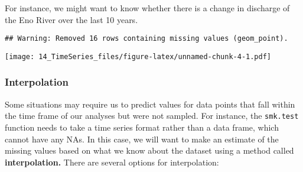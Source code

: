 \documentclass[]{article}
\newenvironment{Shaded}{\begin{snugshade}}{\end{snugshade}}
\newcommand{\KeywordTok}[1]{\textcolor[rgb]{0.13,0.29,0.53}{\textbf{#1}}}
\newcommand{\DataTypeTok}[1]{\textcolor[rgb]{0.13,0.29,0.53}{#1}}
\newcommand{\FloatTok}[1]{\textcolor[rgb]{0.00,0.00,0.81}{#1}}
\newcommand{\StringTok}[1]{\textcolor[rgb]{0.31,0.60,0.02}{#1}}
\newcommand{\CommentTok}[1]{\textcolor[rgb]{0.56,0.35,0.01}{\textit{#1}}}
\newcommand{\OperatorTok}[1]{\textcolor[rgb]{0.81,0.36,0.00}{\textbf{#1}}}
\newcommand{\NormalTok}[1]{#1}
\begin{document}
For instance, we might want to know whether there is a change in
discharge of the Eno River over the last 10 years.

\begin{Shaded}
\end{Shaded}

\begin{verbatim}
## Warning: Removed 16 rows containing missing values (geom_point).
\end{verbatim}

\texttt{[image: 14\_TimeSeries\_files/figure-latex/unnamed-chunk-4-1.pdf]}

\subsubsection{Interpolation}\label{interpolation}

Some situations may require us to predict values for data points that
fall within the time frame of our analyses but were not sampled. For
instance, the \texttt{smk.test} function needs to take a time series
format rather than a data frame, which cannot have any NAs. In this
case, we will want to make an estimate of the missing values based on
what we know about the dataset using a method called
\textbf{interpolation.} There are several options for interpolation:
\end{document}
